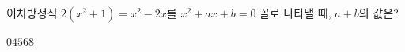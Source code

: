 이차방정식 $2(x^2+1)=x^2-2x$를 $x^2+ax+b=0$ 꼴로 나타낼 때, $a+b$의 값은? 
\begin{choices32}{$0$}{$4$}{$5$}{$6$}{$8$}\end{choices32}

